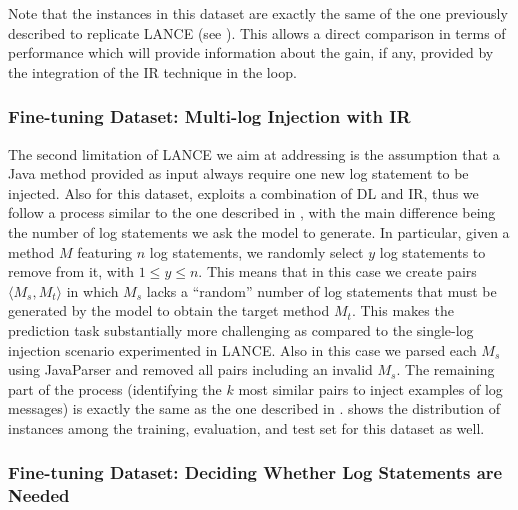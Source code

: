 Note that the instances in this dataset are exactly the same of the one previously described to replicate LANCE (see ). This allows a direct comparison in terms of performance which will provide information about the gain, if any, provided by the integration of the IR technique in the loop.

\subsubsection{Fine-tuning Dataset: Multi-log Injection with IR} \label{sec:multi-log-dataset}

The second limitation of LANCE \cite{mastropaolo2022using} we aim at addressing is the assumption that a Java method provided as input always require one new log statement to be injected. Also for this dataset, \approach exploits a combination of DL and IR, thus we follow a process similar to the one described in , with the main difference being the number of log statements we ask the model to generate. In particular, given a method $M$ featuring $n$ log statements, we randomly select $y$ log statements to remove from it, with $1 \leq y \leq n$. This means that in this case we create pairs $\langle M_s, M_t \rangle$ in which $M_s$ lacks a ``random'' number of log statements that must be generated by the model to obtain the target method $M_t$. This makes the prediction task substantially more challenging as compared to the single-log injection scenario experimented in LANCE. Also in this case we parsed each $M_s$ using JavaParser \cite{javaparser} and removed all pairs including an invalid $M_s$. The remaining part of the process (\ie identifying the $k$ most similar pairs to inject examples of log messages) is exactly the same as the one described in .  shows the distribution of instances among the training, evaluation, and test set for this dataset as well.


\subsubsection{Fine-tuning Dataset: Deciding Whether Log Statements are Needed} \label{sec:predicting-dataset}


